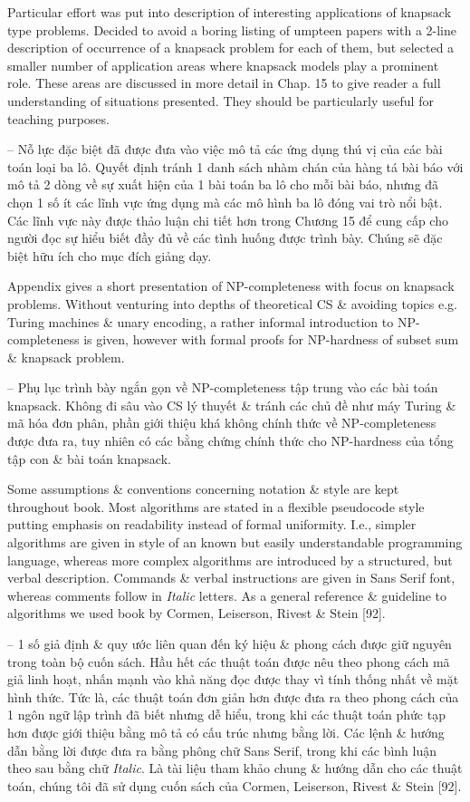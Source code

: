 \documentclass{article}
\begin{document}
\begin{itemize}
    Particular effort was put into description of interesting applications of knapsack type problems. Decided to avoid a boring listing of umpteen papers with a 2-line description of occurrence of a knapsack problem for each of them, but selected a smaller number of application areas where knapsack models play a prominent role. These areas are discussed in more detail in Chap. 15 to give reader a full understanding of situations presented. They should be particularly useful for teaching purposes.
    
    -- Nỗ lực đặc biệt đã được đưa vào việc mô tả các ứng dụng thú vị của các bài toán loại ba lô. Quyết định tránh 1 danh sách nhàm chán của hàng tá bài báo với mô tả 2 dòng về sự xuất hiện của 1 bài toán ba lô cho mỗi bài báo, nhưng đã chọn 1 số ít các lĩnh vực ứng dụng mà các mô hình ba lô đóng vai trò nổi bật. Các lĩnh vực này được thảo luận chi tiết hơn trong Chương 15 để cung cấp cho người đọc sự hiểu biết đầy đủ về các tình huống được trình bày. Chúng sẽ đặc biệt hữu ích cho mục đích giảng dạy.
    
    Appendix gives a short presentation of NP-completeness with focus on knapsack problems. Without venturing into depths of theoretical CS \& avoiding topics e.g. Turing machines \& unary encoding, a rather informal introduction to NP-completeness is given, however with formal proofs for NP-hardness of subset sum \& knapsack problem.
    
    -- Phụ lục trình bày ngắn gọn về NP-completeness tập trung vào các bài toán knapsack. Không đi sâu vào CS lý thuyết \& tránh các chủ đề như máy Turing \& mã hóa đơn phân, phần giới thiệu khá không chính thức về NP-completeness được đưa ra, tuy nhiên có các bằng chứng chính thức cho NP-hardness của tổng tập con \& bài toán knapsack.
    
    Some assumptions \& conventions concerning notation \& style are kept throughout book. Most algorithms are stated in a flexible pseudocode style putting emphasis on readability instead of formal uniformity. I.e., simpler algorithms are given in style of an known but easily understandable programming language, whereas more complex algorithms are introduced by a structured, but verbal description. Commands \& verbal instructions are given in {\sf Sans Serif} font, whereas comments follow in {\it Italic} letters. As a general reference \& guideline to algorithms we used book by Cormen, Leiserson, Rivest \& Stein [92].
    
    -- 1 số giả định \& quy ước liên quan đến ký hiệu \& phong cách được giữ nguyên trong toàn bộ cuốn sách. Hầu hết các thuật toán được nêu theo phong cách mã giả linh hoạt, nhấn mạnh vào khả năng đọc được thay vì tính thống nhất về mặt hình thức. Tức là, các thuật toán đơn giản hơn được đưa ra theo phong cách của 1 ngôn ngữ lập trình đã biết nhưng dễ hiểu, trong khi các thuật toán phức tạp hơn được giới thiệu bằng mô tả có cấu trúc nhưng bằng lời. Các lệnh \& hướng dẫn bằng lời được đưa ra bằng phông chữ {\sf Sans Serif}, trong khi các bình luận theo sau bằng chữ {\it Italic}. Là tài liệu tham khảo chung \& hướng dẫn cho các thuật toán, chúng tôi đã sử dụng cuốn sách của Cormen, Leiserson, Rivest \& Stein [92].
    

\end{itemize}
\end{document}
